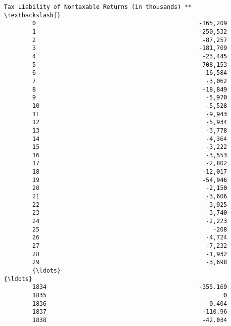 \documentclass[11pt]{article}
\begin{document}
\begin{Verbatim}[commandchars=\\\{\}]
             Tax Liability of Nontaxable Returns (in thousands) **  \textbackslash{}
        0                                              -165,209      
        1                                              -250,532      
        2                                               -87,257      
        3                                              -181,709      
        4                                               -23,445      
        5                                              -708,153      
        6                                               -16,584      
        7                                                -3,062      
        8                                               -18,849      
        9                                                -5,970      
        10                                               -5,528      
        11                                               -9,943      
        12                                               -5,934      
        13                                               -3,778      
        14                                               -4,364      
        15                                               -3,222      
        16                                               -3,553      
        17                                               -2,802      
        18                                              -12,017      
        19                                              -54,946      
        20                                               -2,150      
        21                                               -3,606      
        22                                               -3,925      
        23                                               -3,740      
        24                                               -2,223      
        25                                                 -208      
        26                                               -4,724      
        27                                               -7,232      
        28                                               -1,932      
        29                                               -3,698      
        {\ldots}                                                 {\ldots}      
        1834                                           -355.169      
        1835                                                  0      
        1836                                             -0.404      
        1837                                            -110.96      
        1838                                            -42.034      

\end{Verbatim}
\end{document}
